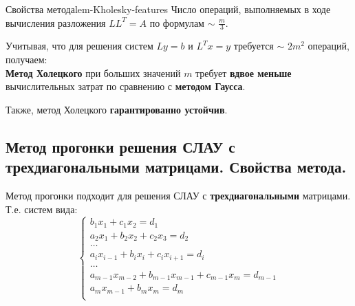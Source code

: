 \documentclass[14pt]{extarticle}
\begin{document}
        \begin{lemma}{Свойства метода}{lem-Kholesky-features}
            Число операций, выполняемых в ходе вычисления разложения $LL^{T} = A$ по формулам $\sim$ $\frac{m}{3}$.

            \vspace{\baselineskip}

            Учитывая, что для решения систем $Ly = b$ и $L^{T}x = y$ требуется $\sim$ $2m^{2}$ операций, получаем:\\
            \textbf{Метод Холецкого} при больших значений $m$ требует \textbf{вдвое меньше} вычислительных затрат по сравнению с \textbf{методом Гаусса}.

            \vspace{\baselineskip}

            Также, метод Холецкого \textbf{гарантированно устойчив}.
        \end{lemma}

\clearpage
\subsection{Метод прогонки решения СЛАУ с трехдиагональными матрицами. Свойства метода.}

        Метод прогонки подходит для решения СЛАУ с \textbf{трехдиагональными} матрицами.\\
        Т.е. систем вида:
        $$
        \begin{cases}
            b_{1}x_{1} + c_{1}x_{2} = d_{1}\\
            a_{2}x_{1} + b_{2}x_{2} + c_{2}x_{3} = d_{2}\\
            
            \ldots\\

            a_{i}x_{i-1} + b_{i}x_{i} + c_{i}x_{i+1} = d_{i}\\

            \ldots\\
            a_{m-1}x_{m-2} + b_{m-1}x_{m-1} + c_{m-1}x_{m} = d_{m-1}\\
            a_{m}x_{m-1} + b_{m}x_{m} = d_{m}\\
        \end{cases}
        $$
\end{document}
